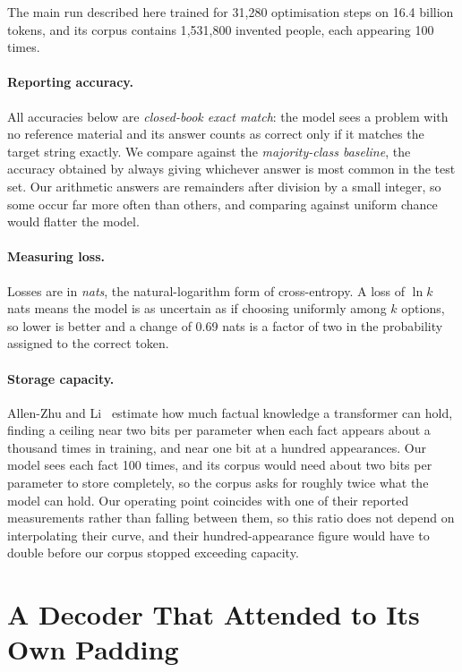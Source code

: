 \documentclass[10pt,twocolumn]{article}
\begin{document}
The main run described here trained for 31{,}280 optimisation steps on 16.4
billion tokens, and its corpus contains 1{,}531{,}800 invented people, each
appearing 100 times.

\paragraph{Reporting accuracy.}
All accuracies below are \emph{closed-book exact match}: the model sees a
problem with no reference material and its answer counts as correct only if it
matches the target string exactly. We compare against the \emph{majority-class
baseline}, the accuracy obtained by always giving whichever answer is most
common in the test set. Our arithmetic answers are remainders after division by
a small integer, so some occur far more often than others, and comparing
against uniform chance would flatter the model.

\paragraph{Measuring loss.}
Losses are in \emph{nats}, the natural-logarithm form of cross-entropy. A loss
of $\ln k$ nats means the model is as uncertain as if choosing uniformly among
$k$ options, so lower is better and a change of 0.69 nats is a factor of two in
the probability assigned to the correct token.

\paragraph{Storage capacity.}
Allen-Zhu and Li~\cite{az} estimate how much factual knowledge a transformer can
hold, finding a ceiling near two bits per parameter when each fact appears about
a thousand times in training, and near one bit at a hundred appearances. Our
model sees each fact 100 times, and its corpus would need about two bits per
parameter to store completely, so the corpus asks for roughly twice what the
model can hold. Our operating point coincides with one of their reported
measurements rather than falling between them, so this ratio does not depend on
interpolating their curve, and their hundred-appearance figure would have to
double before our corpus stopped exceeding capacity.

\section{A Decoder That Attended to Its Own Padding}
\label{sec:pad}
\end{document}
